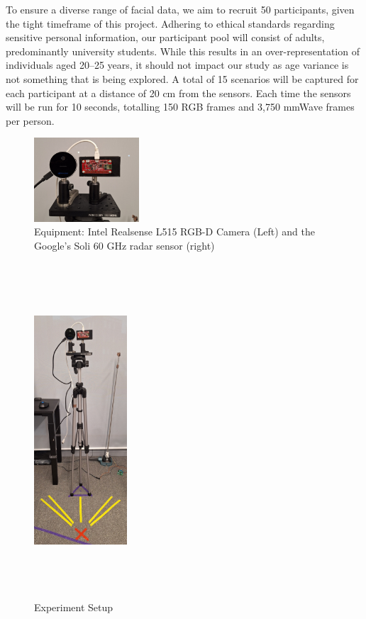 \documentclass{mpaper}
\begin{document}
To ensure a diverse range of facial data, we aim to recruit 50 participants, given the tight timeframe of this project. Adhering to ethical standards regarding sensitive personal information, our participant pool will consist of adults, predominantly university students. While this results in an over-representation of individuals aged 20--25 years, it should not impact our study as age variance is not something that is being explored. A total of 15 scenarios will be captured for each participant at a distance of 20 cm from the sensors. Each time the sensors will be run for 10 seconds, totalling 150 RGB frames and 3,750 mmWave frames per person.

\begin{figure}[h!]
    \centering
    \includegraphics[width=0.35\textwidth]{diagrams/equipment.pdf}
    \vspace{0.2cm}
    \caption{Equipment: Intel Realsense L515 RGB-D Camera (Left) and the Google's Soli 60 GHz radar sensor (right)}
    \label{fig:equipment}
\end{figure}

\begin{figure}[h!]
    \centering
    \includegraphics[width=0.31\textwidth, height=12.5cm]{diagrams/experiment_setup.pdf}
    \caption{Experiment Setup}
    \label{fig:experiment_setup}
\end{figure}
\end{document}
